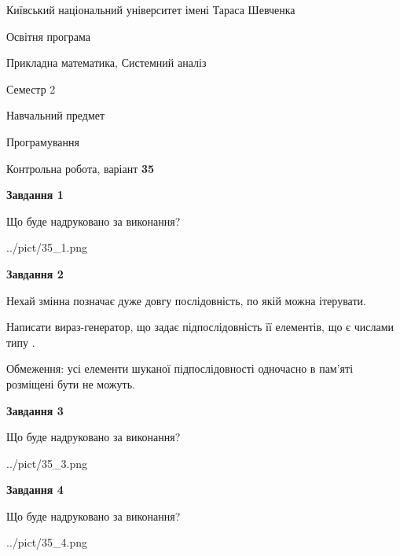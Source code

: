 \documentclass[12pt, ukrainian]{article}
\begin{document}
{{\begin {small}\par
{ \center  Київський національний університет імені Тараса Шевченка \par}
{\parbox {5 cm}{Освітня програма \hfill}{\parbox {8 cm}{Прикладна математика, Системний аналіз \hfill}}\parbox {5 cm}{\hfill Семестр 2}}\par
{\parbox {5 cm} {Навчальний предмет \hfill}\parbox {7 cm}{Програмування \hfill}\parbox {6cm}{\hfill}\par}\vspace{-7pt} \end{small}}{\center Контрольна робота, варіант  \No \textbf
{ 35 }\par}}
{
\begin {large}
{\begin {center}\textbf{Завдання 1}\end {center}}\par
Що буде надруковано за виконання?\par\par
\begin{center}
	{../pict/35_1.png}
\end{center}
\newpage

{\begin {center}\textbf{Завдання 2}\end {center}}\par
Нехай змінна  позначає дуже довгу послідовність, по якій можна ітерувати.

Написати вираз-генератор, що задає підпослідовність її елементів, що є числами типу .

Обмеження: усі елементи шуканої підпослідовності одночасно в пам'яті розміщені бути не можуть.\par
\newpage

{\begin {center}\textbf{Завдання 3}\end {center}}\par
Що буде надруковано за виконання?
\begin{center}
	{../pict/35_3.png}
\end{center}
\newpage

{\begin {center}\textbf{Завдання 4}\end {center}}\par
Що буде надруковано за виконання?\par
\begin{center}
	{../pict/35_4.png}
\end{center}
\newpage


\end{large}}
\end{document}
